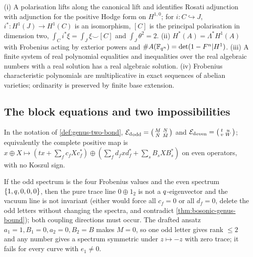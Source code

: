 \begin{assumption}
\label{asm:cm-polarised-lift}
(i) A polarisation lifts along the canonical lift and identifies Rosati adjunction with
adjunction for the positive Hodge form on $H^{1,0}$; for $i\colon C\hookrightarrow J$,
$i^*\colon H^1(J)\to H^1(C)$ is an isomorphism, $[C]$ is the principal polarisation in dimension
two, $\int_Ci^*\xi = \int_J\xi\smile[C]$ and $\int_J\theta^2 = 2$. (ii) $H^*(A) = \Lambda^*H^1(A)$ %
with Frobenius acting by exterior powers and $\#A(\mathbb F_{q^{n}}) = \det(1-F^n|H^1)$. (iii) A finite
system of real polynomial equalities and inequalities over the real algebraic numbers with a
real solution has a real algebraic solution. (iv) Frobenius characteristic polynomials are
multiplicative in exact sequences of abelian varieties; ordinarity is preserved by finite base
extension.
\end{assumption}

\subsection{The block equations and two impossibilities}

\begin{lemma}
\label{lem:genus-two-blocks}
In the notation of \cref{def:genus-two-bond},
${\mathcal E_{\mathrm d}}_{\mathrm{odd}} = \bigl(\begin{smallmatrix}M&N\\ \bar N&\bar M\end{smallmatrix}\bigr)$ and
${\mathcal E_{\mathrm d}}_{\mathrm{even}} = \bigl(\begin{smallmatrix}t&u\\ v&W\end{smallmatrix}\bigr)$; equivalently the
complete positive map is $x\oplus X\mapsto(tx+\sum_fc_fXc_f^*)\oplus(\sum_fd_fxd_f^*+\sum_sB_sXB_s^*)$
on even operators, with no Koszul sign.
\end{lemma}

\begin{proposition}
\label{prop:vacuum-ansatz-impossible}
If the odd spectrum is the four Frobenius values and the even spectrum $\{1,q,0,0,0\}$, then
the pure trace line $0\oplus1_2$ is not a $q$-eigenvector and the vacuum line is not
invariant (either would force all $c_f = 0$ or all $d_f = 0$, delete the odd letters without
changing the spectra, and contradict \cref{thm:bosonic-genus-bound}); both coupling directions
must occur. The drafted ansatz $a_1 = 1,B_1 = 0,a_2 = 0,B_2 = B$ makes $M = 0$, so one odd letter
gives rank $\le2$ and any number gives a spectrum symmetric under $z\mapsto-z$ with zero trace;
it fails for every curve with $e_1\ne0$.
\end{proposition}

